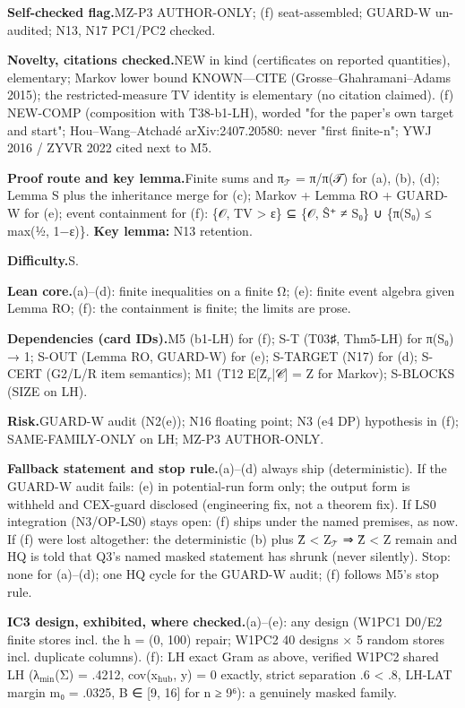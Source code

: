 {\par\smallskip\noindent\textbf{Self-checked flag.}\enspace MZ-P3 AUTHOR-ONLY; (f) seat-assembled; GUARD-W un-audited; N13, N17 PC1/PC2 checked.
\par\smallskip\noindent\textbf{Novelty, citations checked.}\enspace NEW in kind (certificates on reported quantities), elementary; Markov lower bound KNOWN—CITE (Grosse–Ghahramani–Adams 2015); the restricted-measure TV identity is elementary (no citation claimed). (f) NEW-COMP (composition with T38-b1-LH), worded "for the paper's own target and start"; Hou–Wang–Atchadé arXiv:2407.20580: never "first finite-n"; YWJ 2016 / ZYVR 2022 cited next to M5.
\par\smallskip\noindent\textbf{Proof route and key lemma.}\enspace Finite sums and π$_{𝒯}$ = π/π(𝒯) for (a), (b), (d); Lemma S plus the inheritance merge for (c); Markov + Lemma RO + GUARD-W for (e); event containment for (f): \{𝒪, TV \textgreater{} ε\} ⊆ \{𝒪, Ŝ⁺ ≠ S₀\} ∪ \{π(S₀) ≤ max(½, 1−ε)\}. \textbf{Key lemma:} N13 retention.
\par\smallskip\noindent\textbf{Difficulty.}\enspace S.
\par\smallskip\noindent\textbf{Lean core.}\enspace (a)–(d): finite inequalities on a finite Ω; (e): finite event algebra given Lemma RO; (f): the containment is finite; the limits are prose.
\par\smallskip\noindent\textbf{Dependencies (card IDs).}\enspace M5 (b1-LH) for (f); S-T (T03♯, Thm5-LH) for π(S₀) → 1; S-OUT (Lemma RO, GUARD-W) for (e); S-TARGET (N17) for (d); S-CERT (G2/L/R item semantics); M1 (T12 E[Ẑ$_{r}$|𝒞] = Z for Markov); S-BLOCKS (SIZE on LH).
\par\smallskip\noindent\textbf{Risk.}\enspace GUARD-W audit (N2(e)); N16 floating point; N3 (e4 DP) hypothesis in (f); SAME-FAMILY-ONLY on LH; MZ-P3 AUTHOR-ONLY.
\par\smallskip\noindent\textbf{Fallback statement and stop rule.}\enspace (a)–(d) always ship (deterministic). If the GUARD-W audit fails: (e) in potential-run form only; the output form is withheld and CEX-guard disclosed (engineering fix, not a theorem fix). If LS0 integration (N3/OP-LS0) stays open: (f) ships under the named premises, as now. If (f) were lost altogether: the deterministic (b) plus Ẑ \textless{} Z$_{𝒯}$ ⇒ Ẑ \textless{} Z remain and HQ is told that Q3's named masked statement has shrunk (never silently). Stop: none for (a)–(d); one HQ cycle for the GUARD-W audit; (f) follows M5's stop rule.
\par\smallskip\noindent\textbf{IC3 design, exhibited, where checked.}\enspace (a)–(e): any design (W1PC1 D0/E2 finite stores incl. the h = (0, 100) repair; W1PC2 40 designs × 5 random stores incl. duplicate columns). (f): LH exact Gram as above, verified W1PC2 shared LH (λ$_{\mathrm{min}}$(Σ) = .4212, cov(x$_{\mathrm{hub}}$, y) = 0 exactly, strict separation .6 \textless{} .8, LH-LAT margin m₀ = .0325, B ∈ [9, 16] for n ≥ 9⁶): a genuinely masked family.
}
